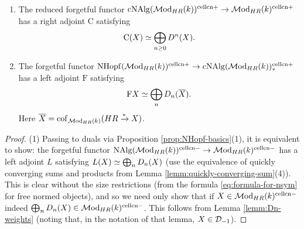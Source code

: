 \documentclass{amsart}
\numberwithin{proposition}{section}
\numberwithin{equation}{section}
\def\cell{\mathrm{cell}}
\def\NHopf{\mathrm{NHopf}}
\def\cNAlg{\mathrm{cNAlg}}
\def\cn{\mathrm{cn}}
\def\Free{\mathrm{F}}
\def\Cofree{\mathrm{C}}
\begin{document}
\begin{proposition} \label{prop:NHopf-adj}
\begin{enumerate}
\item The reduced forgetful functor $\cNAlg(\Mod_{HR}(k))^{\cell\cn+} \to \Mod_{HR}(k)^{\cell\cn+}$ has a right adjoint $\Cofree$ satisfying \[ \Cofree(X) \wequi \bigoplus_{n \ge 0} D^n(X). \]
\item The forgetful functor $\NHopf(\Mod_{HR}(k))^{\cell\cn+} \to \cNAlg(\Mod_{HR}(k))^{\cell\cn+}_*$ has a left adjoint $\Free$ satisfying \[ \Free X \wequi \bigoplus_n D_n(\overline{X}). \]
  Here $\overline{X} = \operatorname{cof}_{\mathcal{M}\mathrm{od}_{HR}(k)}(HR \xrightarrow{*} X)$.
\end{enumerate}
\end{proposition}
\begin{proof}
(1) Passing to duals via Proposition \ref{prop:NHopf-basics}(1), it is equivalent to show: the forgetful functor $\NAlg(\Mod_{HR}(k))^{\cell\cn-} \to \Mod_{HR}(k)^{\cell\cn-}$ has a left adjoint $L$ satisfying $L(X) \simeq \bigoplus_n D_n(X)$ (use the equivalence of quickly converging sums and products from Lemma \ref{lemm:quickly-converging-sum}(4)).
This is clear without the size restrictions (from the formula \eqref{eq:formula-for-nsym} for free normed objects), and so we need only show that if $X \in \Mod_{HR}(k)^{\cell\cn-}$ indeed $\bigoplus_n D_n(X) \in \Mod_{HR}(k)^{\cell\cn-}$.
This follows from Lemma \ref{lemm:Dn-weights} (noting that, in the notation of that lemma, $X \in \mathcal D_{-1}$).


\end{proof}
\end{document}
